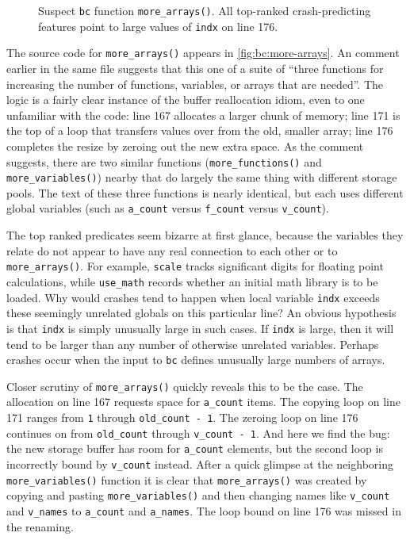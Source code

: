 \begin{figure}
  \centering
  \small
  \caption{Suspect \texttt{bc} function \texttt{more\_arrays()}.  All
  top-ranked crash-predicting features point to large values of
  \texttt{indx} on line 176.}
  \label{fig:bc:more-arrays}
\end{figure}

The source code for \texttt{more\_arrays()} appears in
\autoref{fig:bc:more-arrays}.  An comment earlier in the same file
suggests that this one of a suite of ``three functions for increasing
the number of functions, variables, or arrays that are needed''.  The
logic is a fairly clear instance of the buffer reallocation idiom,
even to one unfamiliar with the code: line 167 allocates a larger
chunk of memory; line 171 is the top of a loop that transfers values
over from the old, smaller array; line 176 completes the resize by
zeroing out the new extra space.  As the comment suggests, there are
two similar functions (\texttt{more\_functions()} and
\texttt{more\_variables()}) nearby that do largely the same thing with
different storage pools.  The text of these three functions is nearly
identical, but each uses different global variables (such as
\texttt{a\_count} versus \texttt{f\_count} versus \texttt{v\_count}).

The top ranked predicates seem bizarre at first glance, because the
variables they relate do not appear to have any real connection to
each other or to \texttt{more\_arrays()}.  For example, \texttt{scale}
tracks significant digits for floating point calculations, while
\texttt{use\_math} records whether an initial math library is to be
loaded.  Why would crashes tend to happen when local variable
\texttt{indx} exceeds these seemingly unrelated globals on this
particular line?  An obvious hypothesis is that \texttt{indx} is
simply unusually large in such cases.  If \texttt{indx} is large, then
it will tend to be larger than any number of otherwise unrelated
variables.  Perhaps crashes occur when the input to \texttt{bc}
defines unusually large numbers of arrays.

Closer scrutiny of \texttt{more\_arrays()} quickly reveals this to be
the case.  The allocation on line 167 requests space for
\texttt{a\_count} items.  The copying loop on line 171 ranges from
\texttt{1} through \texttt{old\_count - 1}.  The zeroing loop on line
176 continues on from \texttt{old\_count} through \texttt{v\_count -
  1}.  And here we find the bug: the new storage buffer has room for
\texttt{a\_count} elements, but the second loop is incorrectly bound
by \texttt{v\_count} instead.  After a quick glimpse at the
neighboring \texttt{more\_variables()} function it is clear that
\texttt{more\_arrays()} was created by copying and pasting
\texttt{more\_variables()} and then changing names like
\texttt{v\_count} and \texttt{v\_names} to \texttt{a\_count} and
\texttt{a\_names}.  The loop bound on line 176 was missed in the
renaming.

